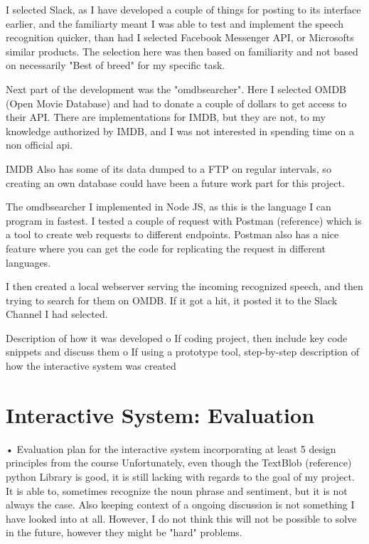 \documentclass[11pt,fleqn]{book} %
\begin{document}
I selected Slack, as I have developed a couple of things for posting to its interface earlier, and the familiarty meant I was able to test and implement the speech recognition quicker, than had I selected Facebook Messenger API, or Microsofts similar products.
The selection here was then based on familiarity and not based on necessarily "Best of breed" for my specific task.

Next part of the development was the "omdbsearcher". Here I selected OMDB (Open Movie Database) and had to donate a couple of dollars to get access to their API. There are implementations for IMDB, but they are not, to my knowledge authorized by IMDB, and I was not interested in spending time on a non official api.

IMDB Also has some of its data dumped to a FTP on regular intervals, so creating an own database could have been a future work part for this project.

The omdbsearcher I implemented in Node JS, as this is the language I can program in fastest. I tested a couple of request with Postman (reference) which is a tool to create web requests to different endpoints. Postman also has a nice feature where you can get the code for replicating the request in different languages.

I then created a local webserver serving the incoming recognized speech, and then trying to search for them on OMDB. If it got a hit, it posted it to the Slack Channel I had selected.

Description of how it was developed
o	If coding project, then include key code snippets and discuss them
o	If using a prototype tool, step-by-step description of how the interactive system was created




\chapter{Interactive System: Evaluation}
•	Evaluation plan for the interactive system incorporating at least 5 design principles from the course
Unfortunately, even though the TextBlob (reference) python Library is good, it is still lacking with regards to the goal of my project.
It is able to, sometimes recognize the noun phrase and sentiment, but it is not always the case.
Also keeping context of a ongoing discussion is not something I have looked into at all.
However, I do not think this will not be possible to solve in the future, however they might be "hard" problems.
\end{document}
